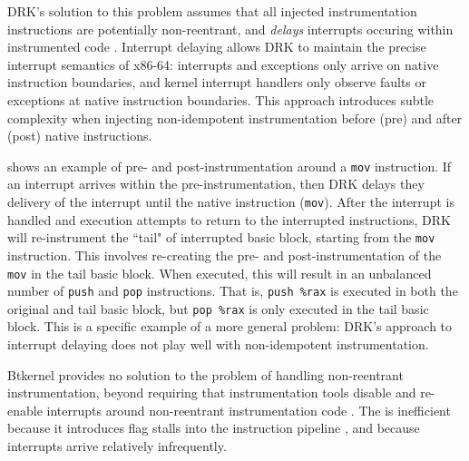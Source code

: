 \documentclass[preprint]{sigplanconf}
\begin{document}
DRK's solution to this problem assumes that all injected instrumentation instructions are potentially non-reentrant, and \emph{delays} interrupts occuring within instrumented code \cite{DRK}. Interrupt delaying allows DRK to maintain the precise interrupt semantics of x86-64: interrupts and exceptions only arrive on native instruction boundaries, and kernel interrupt handlers only observe faults or exceptions at native instruction boundaries. This approach introduces subtle complexity when injecting non-idempotent instrumentation before (pre) and after (post) native instructions.

 shows an example of pre- and post-instrumentation around a \texttt{mov} instruction. If an interrupt arrives within the pre-instrumentation, then DRK delays they delivery of the interrupt until the native instruction (\texttt{mov}). After the interrupt is handled and execution attempts to return to the interrupted instructions, DRK will re-instrument the ``tail" of interrupted basic block, starting from the \texttt{mov} instruction. This involves re-creating the pre- and post-instrumentation of the \texttt{mov} in the tail basic block. When executed, this will result in an unbalanced number of \texttt{push} and \texttt{pop} instructions. That is, \texttt{push \%rax} is executed in both the original and tail basic block, but \texttt{pop \%rax} is only executed in the tail basic block. This is a specific example of a more general problem: DRK's approach to interrupt delaying does not play well with non-idempotent instrumentation.


Btkernel provides no solution to the problem of handling non-reentrant instrumentation, beyond requiring that instrumentation tools disable and re-enable interrupts around non-reentrant instrumentation code \cite{btkernel}. The is inefficient because it introduces flag stalls into the instruction pipeline \cite{AgnerMicroarchitecture}, and because interrupts arrive relatively infrequently.
\end{document}

